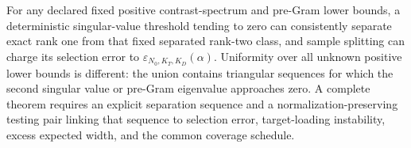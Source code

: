 For any declared fixed positive contrast-spectrum and pre-Gram lower bounds, a deterministic singular-value threshold tending to zero can consistently separate exact rank one from that fixed separated rank-two class, and sample splitting can charge its selection error to \(\varepsilon_{N_0,K_T,K_D}(\alpha)\).  Uniformity over all unknown positive lower bounds is different: the union contains triangular sequences for which the second singular value or pre-Gram eigenvalue approaches zero.  A complete theorem requires an explicit separation sequence and a normalization-preserving testing pair linking that sequence to selection error, target-loading instability, excess expected width, and the common coverage schedule.